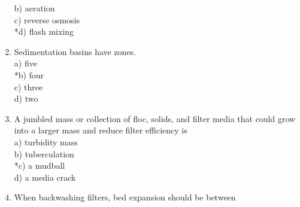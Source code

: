 \begin{enumerate}
b) aeration\\
c) reverse osmosis\\
*d) flash mixing\\
  \item Sedimentation basins have zones.\\
a) five\\
*b) four\\
c) three\\
d) two\\
  \item A jumbled mass or collection of floc, solids, and filter media that could grow into a larger mass and reduce filter efficiency is\\
a) turbidity mass\\
b) tuberculation\\
*c) a mudball\\
d) a media crack\\
  \item When backwashing filters, bed expansion should be between\\


\end{enumerate}
